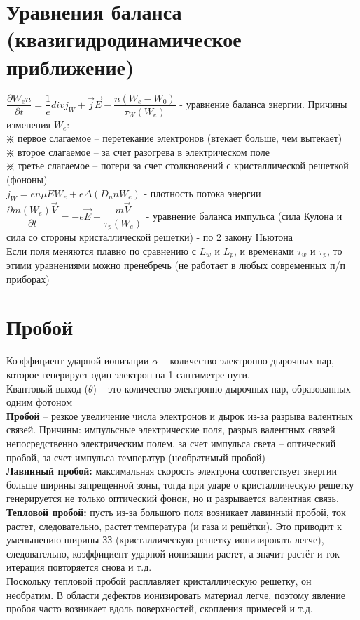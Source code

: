 \begin{multicols*}{2}
		\section{Уравнения баланса (квазигидродинамическое приближение)}
		$\dfrac{\partial W_e n}{\partial t} = \dfrac{1}{e} div j_W + \vec{j}\vec{E} - \dfrac{n(W_e - W_0)}{\tau_W(W_e)}$ - уравнение баланса энергии. Причины изменения $W_e$:\\
		$\divideontimes$ первое слагаемое – перетекание электронов (втекает больше, чем вытекает)\\
		$\divideontimes$ второе слагаемое – за счет разогрева в электрическом поле\\
		$\divideontimes$ третье слагаемое – потери за счет столкновений с кристаллической решеткой (фононы)\\
		$j_W = en \mu E W_e + e \Delta(D_n n W_e)$ - плотность потока энергии\\
		$\dfrac{\partial m (W_e) \vec{V}}{\partial t} = -e\vec{E} - \dfrac{m\vec{V}}{\tau_p(W_e)}$ - уравнение баланса импульса (сила Кулона и сила со стороны кристаллической решетки) - по 2 закону Ньютона \\
		Если поля меняются плавно по сравнению с $L_w$ и $L_p$, и временами $\tau_w$ и $\tau_p$, то этими уравнениями можно пренебречь (не работает в любых современных п/п приборах)

		\section{Пробой}
		Коэффициент ударной ионизации $\alpha$ – количество электронно-дырочных пар, которое генерирует один электрон на 1 сантиметре пути.\\
		Квантовый выход ($\theta$) – это количество электронно-дырочных пар, образованных одним фотоном\\
		\textbf{Пробой} – резкое увеличение числа электронов и дырок из-за разрыва валентных связей. Причины: импульсные электрические поля, разрыв валентных связей непосредственно электрическим полем, за счет импульса света – оптический пробой, за счет импульса температур (необратимый пробой)\\
		\textbf{Лавинный пробой:} максимальная скорость электрона соответствует энергии больше ширины запрещенной зоны,	тогда при ударе о кристаллическую решетку генерируется не только оптический фонон, но и	разрывается валентная связь.\\
		\textbf{Тепловой пробой:} пусть из-за большого поля возникает лавинный пробой, ток растет, следовательно, растет температура (и газа и решётки). Это приводит к уменьшению ширины ЗЗ (кристаллическую решетку ионизировать легче), следовательно, коэффициент ударной ионизации растет, а значит растёт и ток – итерация повторяется снова и т.д.\\
		Поскольку тепловой пробой расплавляет кристаллическую решетку, он необратим. В области дефектов ионизировать материал легче, поэтому явление пробоя часто возникает вдоль поверхностей, скопления примесей и т.д.


\end{multicols*}
